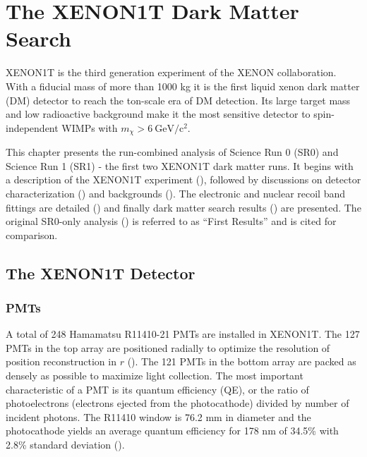

\pagestyle{cu}
\graphicspath{{./Chapter3/Figures/}}
\chapter[The XENON1T Dark Matter Search][The XENON1T Dark Matter Search]{The XENON1T Dark Matter Search}



XENON1T is the third generation experiment of the XENON collaboration.  With a fiducial mass of more than 1000 kg it is the first
liquid xenon dark matter (DM) detector to reach the ton-scale era of DM detection.  Its large target mass and low radioactive background
make it the most sensitive detector to spin-independent WIMPs with $m_{\chi} > 6\ \mathrm{GeV / c^2}$.

This chapter presents the run-combined analysis of Science Run 0 (SR0) and Science Run 1 (SR1) - the first two XENON1T dark matter
runs.  It begins with a description of the XENON1T experiment (), followed by discussions on detector
characterization () and backgrounds
().  The electronic and nuclear recoil band fittings are
detailed () and finally dark matter search results () are
presented.  The original SR0-only analysis () is referred to as ``First Results'' and is cited for comparison.

\section{The XENON1T Detector}
\label{sec:xenon1t_detector}




\subsection{PMTs}
\label{subsec:xenon1t_pmts}
A total of 248 Hamamatsu R11410-21 PMTs are installed in XENON1T.  The 127 PMTs in the top array are positioned radially to
optimize the resolution of position reconstruction in $r$ ().  The 121 PMTs in the bottom
array are packed as densely as possible to maximize light collection.  The most important characteristic of a PMT is its quantum
efficiency
(QE), or the ratio of photoelectrons (electrons ejected from the photocathode) divided by number of incident photons.  The R11410 window is
76.2 mm in diameter and the photocathode yields an average quantum efficiency for 178 nm of 34.5\% with 2.8\%
standard deviation ().

